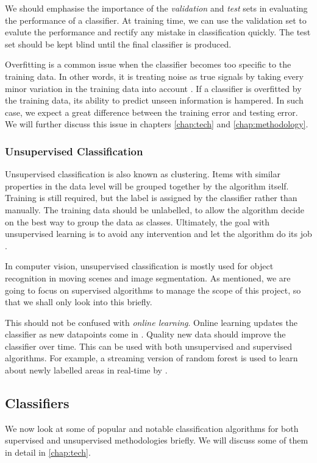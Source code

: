 We should emphasise the importance of the \textit{validation} and \textit{test} sets in evaluating the performance of a classifier. At training time, we can use the validation set to evalute the performance and rectify any mistake in classification quickly. The test set should be kept blind until the final classifier is produced. 

Overfitting is a common issue when the classifier becomes too specific to the training data. In other words, it is treating noise as true signals by taking every minor variation in the training data into account \cite{mur-book}. If a classifier is overfitted by the training data, its ability to predict unseen information is hampered. In such case, we expect a great difference between the training error and testing error. We will further discuss this issue in chapters \ref{chap:tech} and \ref{chap:methodology}. 


\subsubsection{Unsupervised Classification} \label{sssec:unsupervised_overview}
Unsupervised classification is also known as clustering. Items with similar properties in the data level will be grouped together by the algorithm itself. Training is still required, but the label is assigned by the classifier rather than manually. The training data should be unlabelled, to allow the algorithm decide on the best way to group the data as classes. Ultimately, the goal with unsupervised learning is to avoid any intervention and let the algorithm do its job \cite{hall-notes}. 

In computer vision, unsupervised classification is mostly used for object recognition in moving scenes and image segmentation. As mentioned, we are going to focus on supervised algorithms to manage the scope of this project, so that we shall only look into this briefly. 

This should not be confused with \textit{online learning}. Online learning updates the classifier as new datapoints come in \cite{mur-book}. Quality new data should improve the classifier over time. This can be used with both unsupervised and supervised algorithms. For example, a streaming version of random forest is used to learn about newly labelled areas in real-time by .


\newpage
\subsection{Classifiers} \label{ssec:classifiers}
We now look at some of popular and notable classification algorithms for both supervised and unsupervised methodologies briefly. We will discuss some of them in detail in \autoref{chap:tech}.

